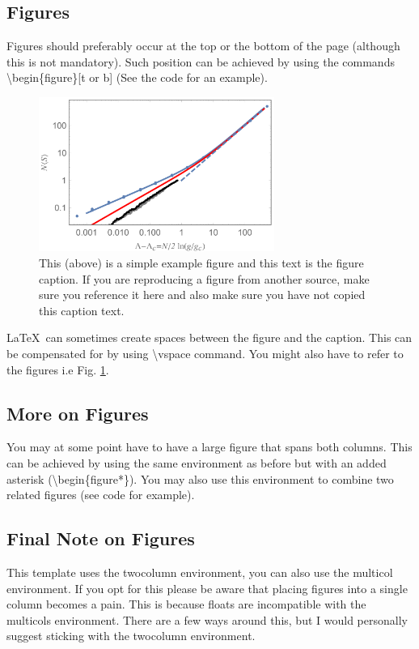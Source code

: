 \documentclass[a4paper, twocolumn, 12pt, notitlepage]{revtex4-1}
\begin{document}
\subsection{Figures}
Figures should preferably occur at the top or the bottom of the page (although this is not mandatory). Such position can be achieved by using the commands \textbackslash begin\{figure\}[t or b] (See the code for an example).  

\begin{figure}[b]
\centering
\includegraphics[width=77mm]{pngexample.png}
\caption{\small This (above) is a simple example figure and this text is the figure caption. If you are reproducing a figure from another source, make sure you reference it here and also make sure you have not copied this caption text.}
\label{fig: fig_1}
\end{figure}

\LaTeX\ can sometimes create spaces between the figure and the caption. This can be compensated for by using \textbackslash vspace command. You might also have to refer to the figures i.e Fig. \ref{fig: fig_1}.

\vspace{-5mm}

\subsection{More on Figures}
You may at some point have to have a large figure that spans both columns. This can be achieved by using the same environment as before but with an added asterisk (\textbackslash begin\{figure*\}). You may also use this environment to combine two related figures (see code for example).

\subsection{Final Note on Figures}
This template uses the twocolumn environment, you can also use the multicol environment. If you opt for this please be aware that placing figures into a single column becomes a pain. This is because floats are incompatible with the multicols environment. There are a few ways around this, but I would personally suggest sticking with the twocolumn environment.
\end{document}
